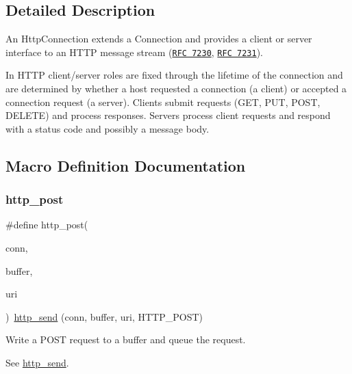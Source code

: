 \subsection{Detailed Description}
An Http\+Connection extends a Connection and provides a client or server interface to an H\+T\+TP message stream (\href{https://tools.ietf.org/html/rfc7230}{\tt R\+FC 7230}, \href{https://tools.ietf.org/html/rfc7231}{\tt R\+FC 7231}).

In H\+T\+TP client/server roles are fixed through the lifetime of the connection and are determined by whether a host requested a connection (a client) or accepted a connection request (a server). Clients submit requests (G\+ET, P\+UT, P\+O\+ST, D\+E\+L\+E\+TE) and process responses. Servers process client requests and respond with a status code and possibly a message body. 

\subsection{Macro Definition Documentation}
\mbox{\label{group__http__connection_ga4242e44b555e915d598838a9b78ddbdf}} 
\subsubsection{\texorpdfstring{http\+\_\+post}{http\_post}}
{\footnotesize\ttfamily \#define http\+\_\+post(\begin{DoxyParamCaption}\item[{}]{conn,  }\item[{}]{buffer,  }\item[{}]{uri }\end{DoxyParamCaption})~\hyperlink{group__http__connection_ga9d3a703c0cf3b053e915eaec5b394c28}{http\+\_\+send} (conn, buffer, uri, H\+T\+T\+P\+\_\+\+P\+O\+ST)}



Write a P\+O\+ST request to a buffer and queue the request. 

See \hyperlink{group__http__connection_ga9d3a703c0cf3b053e915eaec5b394c28}{http\+\_\+send}. \mbox{\label{group__http__connection_gae0780a5dd17b70dee776f2cf9a91a242}} 
